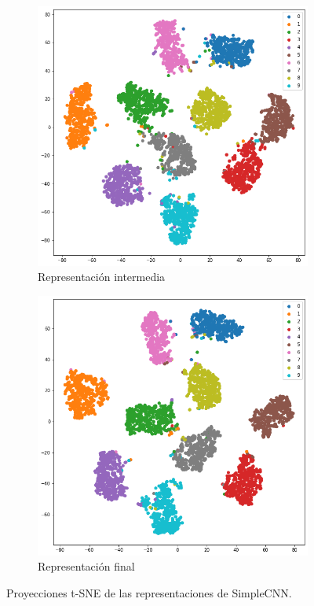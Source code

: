 \documentclass[11pt]{article}
\begin{document}
\begin{figure}[h!]
     \centering
     \begin{subfigure}[b]{0.45\textwidth}
         \centering
         \includegraphics[width=\textwidth]{img/1_tsne_intermediate}
         \caption{Representación intermedia}
     \end{subfigure}
     \hfill
     \begin{subfigure}[b]{0.45\textwidth}
         \centering
         \includegraphics[width=\textwidth]{img/1_tsne_final}
         \caption{Representación final}
     \end{subfigure}
        \caption{Proyecciones t-SNE de las representaciones de SimpleCNN.}
        \label{fig:1_tsne}
\end{figure}
\end{document}
